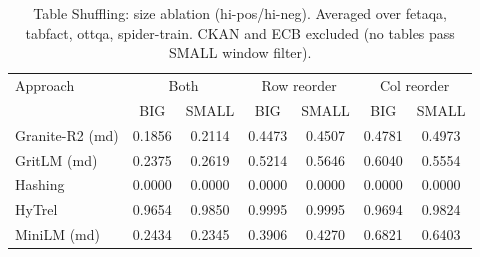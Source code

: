 \begin{table}[t]
\centering
\begin{tabular*}{\textwidth}{lcccccc}
\hline
Approach & \multicolumn{2}{c}{Both} & \multicolumn{2}{c}{Row reorder} & \multicolumn{2}{c}{Col reorder} \\
 & BIG & SMALL & BIG & SMALL & BIG & SMALL \\
\hline
Granite-R2 (md) & 0.1856 & 0.2114 & 0.4473 & 0.4507 & 0.4781 & 0.4973 \\
GritLM (md) & 0.2375 & 0.2619 & 0.5214 & 0.5646 & 0.6040 & 0.5554 \\
Hashing & 0.0000 & 0.0000 & 0.0000 & 0.0000 & 0.0000 & 0.0000 \\
HyTrel & 0.9654 & 0.9850 & 0.9995 & 0.9995 & 0.9694 & 0.9824 \\
MiniLM (md) & 0.2434 & 0.2345 & 0.3906 & 0.4270 & 0.6821 & 0.6403 \\
\hline
\end{tabular*}
\caption{Table Shuffling: size ablation (hi-pos/hi-neg). Averaged over fetaqa, tabfact, ottqa, spider-train. CKAN and ECB excluded (no tables pass SMALL window filter).}
\label{tab:shuffling_size}
\end{table}

